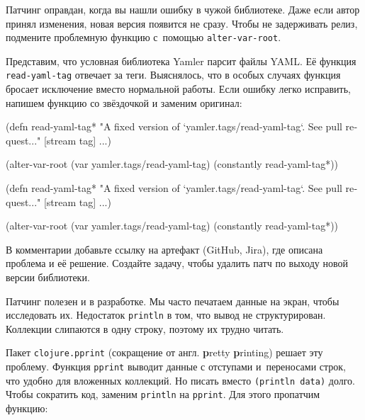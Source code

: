 Патчинг оправдан, когда вы нашли ошибку в чужой библиотеке. Даже если автор
принял изменения, новая версия появится не сразу. Чтобы не задерживать релиз,
подмените проблемную функцию с~помощью \verb|alter-var-root|.

Представим, что условная библиотека Yamler парсит файлы YAML. Её функция
\verb|read-yaml-tag| отвечает за теги. Выяснялось, что в особых случаях функция
бросает исключение вместо нормальной работы. Если ошибку легко исправить,
напишем функцию со звёздочкой и заменим оригинал:

\ifnarrow

\begin{english}
  \begin{clojure}
(defn read-yaml-tag*
  "A fixed version of
   `yamler.tags/read-yaml-tag`.
   See pull request..."
  [stream tag]
  ...)

(alter-var-root
 (var yamler.tags/read-yaml-tag)
 (constantly read-yaml-tag*))
  \end{clojure}
\end{english}

\else

\begin{english}
  \begin{clojure}
(defn read-yaml-tag*
  "A fixed version of `yamler.tags/read-yaml-tag`.
   See pull request..."
  [stream tag]
  ...)

(alter-var-root
 (var yamler.tags/read-yaml-tag)
 (constantly read-yaml-tag*))
  \end{clojure}
\end{english}

\fi

В комментарии добавьте ссылку на артефакт (GitHub, Jira), где описана проблема и
её решение. Создайте задачу, чтобы удалить патч по выходу новой версии
библиотеки.

Патчинг полезен и в разработке. Мы часто печатаем данные на экран, чтобы
исследовать их. Недостаток \verb|println| в том, что вывод не
структурирован. Коллекции слипаются в одну строку, поэтому их трудно читать.


Пакет \verb|clojure.pprint| (сокращение от англ. \textbf{p}retty \textbf{p}rinting)
решает эту проблему. Функция \verb|pprint| выводит данные с отступами и~переносами строк,
что удобно для вложенных коллекций. Но писать 
вместо \verb|(println data)| долго. Чтобы сократить код, заменим \verb|println|
на \verb|pprint|. Для этого пропатчим функцию:

